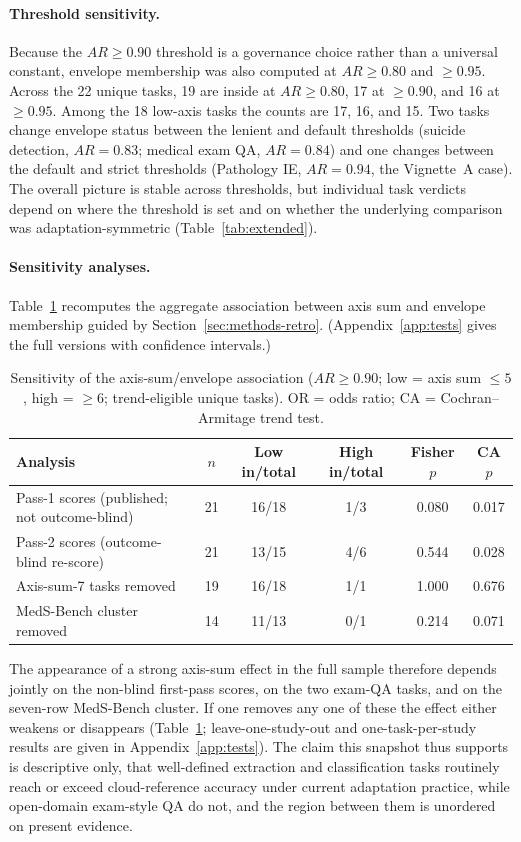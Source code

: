 \documentclass[11pt]{article}
\begin{document}
\paragraph{Threshold sensitivity.}
Because the $AR \geq 0.90$ threshold is a governance choice rather than a universal constant, envelope membership was also computed at $AR \geq 0.80$ and $\geq 0.95$. Across the 22 unique tasks, 19 are inside at $AR \geq 0.80$, 17 at $\geq 0.90$, and 16 at $\geq 0.95$. Among the 18 low-axis tasks the counts are 17, 16, and 15. Two tasks change envelope status between the lenient and default thresholds (suicide detection, $AR = 0.83$; medical exam QA, $AR = 0.84$) and one changes between the default and strict thresholds (Pathology IE, $AR = 0.94$, the Vignette~A case). The overall picture is stable across thresholds, but individual task verdicts depend on where the threshold is set and on whether the underlying comparison was adaptation-symmetric (Table~\ref{tab:extended}).

\paragraph{Sensitivity analyses.}
Table~\ref{tab:sensitivity} recomputes the aggregate association between axis sum and envelope membership guided by Section~\ref{sec:methods-retro}. (Appendix~\ref{app:tests} gives the full versions with confidence intervals.)

\begin{table}[ht]
\centering
\small
\caption{Sensitivity of the axis-sum/envelope association ($AR \geq 0.90$; low = axis sum $\leq 5$, high = $\geq 6$; trend-eligible unique tasks). OR = odds ratio; CA = Cochran--Armitage trend test.}
\label{tab:sensitivity}
\begin{tabular}{@{}lccccc@{}}
\toprule
Analysis & $n$ & Low in/total & High in/total & Fisher $p$ & CA $p$ \\
\midrule
Pass-1 scores (published; not outcome-blind) & 21 & 16/18 & 1/3 & 0.080 & 0.017 \\
Pass-2 scores (outcome-blind re-score) & 21 & 13/15 & 4/6 & 0.544 & 0.028 \\
Axis-sum-7 tasks removed & 19 & 16/18 & 1/1 & 1.000 & 0.676 \\
MedS-Bench cluster removed & 14 & 11/13 & 0/1 & 0.214 & 0.071 \\
\bottomrule
\end{tabular}
\end{table}

The appearance of a strong axis-sum effect in the full sample therefore depends jointly on the non-blind first-pass scores, on the two exam-QA tasks, and on the seven-row MedS-Bench cluster. If one removes any one of these the effect either weakens or disappears (Table~\ref{tab:sensitivity}; leave-one-study-out and one-task-per-study results are given in Appendix~\ref{app:tests}). The claim this snapshot thus supports is descriptive only, that well-defined extraction and classification tasks routinely reach or exceed cloud-reference accuracy under current adaptation practice, while open-domain exam-style QA do not, and the region between them is unordered on present evidence.
\end{document}
